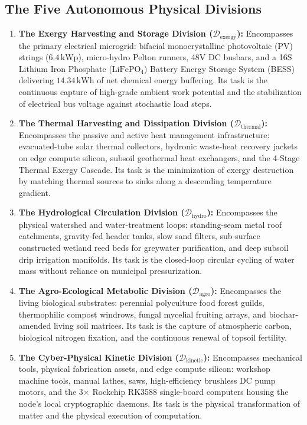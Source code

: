 \subsection{The Five Autonomous Physical Divisions}
\begin{enumerate}
    \item \textbf{The Exergy Harvesting and Storage Division ($\mathcal{D}_{\mathrm{exergy}}$):} 
    Encompasses the primary electrical microgrid: bifacial monocrystalline photovoltaic (PV) strings ($6.4\,\mathrm{kWp}$), micro-hydro Pelton runners, 48V DC busbars, and a 16S Lithium Iron Phosphate ($\mathrm{LiFePO}_4$) Battery Energy Storage System (BESS) delivering $14.34\,\mathrm{kWh}$ of net chemical energy buffering. Its task is the continuous capture of high-grade ambient work potential and the stabilization of electrical bus voltage against stochastic load steps.
    
    \item \textbf{The Thermal Harvesting and Dissipation Division ($\mathcal{D}_{\mathrm{thermal}}$):}
    Encompasses the passive and active heat management infrastructure: evacuated-tube solar thermal collectors, hydronic waste-heat recovery jackets on edge compute silicon, subsoil geothermal heat exchangers, and the 4-Stage Thermal Exergy Cascade. Its task is the minimization of exergy destruction by matching thermal sources to sinks along a descending temperature gradient.
    
    \item \textbf{The Hydrological Circulation Division ($\mathcal{D}_{\mathrm{hydro}}$):}
    Encompasses the physical watershed and water-treatment loops: standing-seam metal roof catchments, gravity-fed header tanks, slow sand filters, sub-surface constructed wetland reed beds for greywater purification, and deep subsoil drip irrigation manifolds. Its task is the closed-loop circular cycling of water mass without reliance on municipal pressurization.
    
    \item \textbf{The Agro-Ecological Metabolic Division ($\mathcal{D}_{\mathrm{agro}}$):}
    Encompasses the living biological substrates: perennial polyculture food forest guilds, thermophilic compost windrows, fungal mycelial fruiting arrays, and biochar-amended living soil matrices. Its task is the capture of atmospheric carbon, biological nitrogen fixation, and the continuous renewal of topsoil fertility.
    
    \item \textbf{The Cyber-Physical Kinetic Division ($\mathcal{D}_{\mathrm{kinetic}}$):}
    Encompasses mechanical tools, physical fabrication assets, and edge compute silicon: workshop machine tools, manual lathes, saws, high-efficiency brushless DC pump motors, and the 3$\times$ Rockchip RK3588 single-board computers housing the node's local cryptographic daemons. Its task is the physical transformation of matter and the physical execution of computation.
\end{enumerate}

